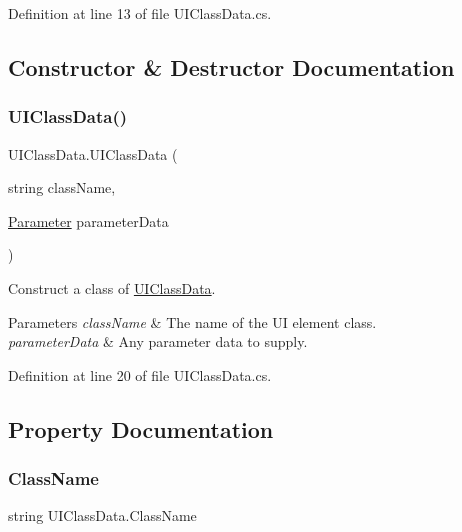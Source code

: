Definition at line 13 of file U\+I\+Class\+Data.\+cs.



\subsection{Constructor \& Destructor Documentation}
\mbox{\label{struct_u_i_class_data_afbef721e15c3ef0806b293d53f1f59ae}} 
\subsubsection{\texorpdfstring{U\+I\+Class\+Data()}{UIClassData()}}
{\footnotesize\ttfamily U\+I\+Class\+Data.\+U\+I\+Class\+Data (\begin{DoxyParamCaption}\item[{string}]{class\+Name,  }\item[{\hyperlink{class_parameter}{Parameter}}]{parameter\+Data }\end{DoxyParamCaption})}



Construct a class of \hyperlink{struct_u_i_class_data}{U\+I\+Class\+Data}. 


\begin{DoxyParams}{Parameters}
{\em class\+Name} & The name of the UI element class. \\
\hline
{\em parameter\+Data} & Any parameter data to supply. \\
\hline
\end{DoxyParams}


Definition at line 20 of file U\+I\+Class\+Data.\+cs.



\subsection{Property Documentation}
\mbox{\label{struct_u_i_class_data_adb8a79a22e09f9941eb1aa24aebf9c88}} 
\subsubsection{\texorpdfstring{Class\+Name}{ClassName}}
{\footnotesize\ttfamily string U\+I\+Class\+Data.\+Class\+Name\hspace{0.3cm}{\ttfamily [get]}}



